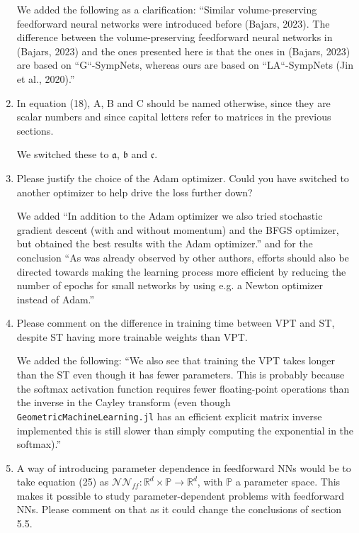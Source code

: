 \documentclass{article}
\begin{document}
\begin{enumerate}
        {\color{mred} We added the following as a clarification: ``Similar volume-preserving feedforward neural networks were introduced before (Bajars, 2023). The difference between the volume-preserving feedforward neural networks in (Bajars, 2023) and the ones presented here is that the ones in (Bajars, 2023) are based on ``G``-SympNets, whereas ours are based on ``LA``-SympNets (Jin et al., 2020).''}
\item In equation (18), A, B and C should be named otherwise, since they are scalar numbers and since capital letters refer to matrices in the previous sections.

        {\color{mred} We switched these to $\mathfrak{a}$, $\mathfrak{b}$ and $\mathfrak{c}$.}
\item Please justify the choice of the Adam optimizer. Could you have switched to another optimizer to help drive the loss further down?

        {\color{mred} We added ``In addition to the Adam optimizer we also tried stochastic gradient descent (with and without momentum) and the BFGS optimizer, but obtained the best results with the Adam optimizer.'' and for the conclusion ``As was already observed by other authors, efforts should also be directed towards making the learning process more efficient by reducing the number of epochs for small networks by using e.g. a Newton optimizer instead of Adam.''}
\item Please comment on the difference in training time between VPT and ST, despite ST having more trainable weights than VPT.

        {\color{mred} We added the following: ``We also see that training the VPT takes longer than the ST even though it has fewer parameters. This is probably because the softmax activation function requires fewer floating-point operations than the inverse in the Cayley transform (even though \texttt{GeometricMachineLearning.jl} has an efficient explicit matrix inverse implemented this is still slower than simply computing the exponential in the softmax).''}

\item A way of introducing parameter dependence in feedforward NNs would be to take equation (25) as $\mathcal{NN}_{ff}: \mathbb{R}^d\times\mathbb{P}\to\mathbb{R}^d$, with $\mathbb{P}$ a parameter space. This makes it possible to study parameter-dependent problems with feedforward NNs. Please comment on that as it could change the conclusions of section 5.5.
\end{enumerate}
\end{document}
